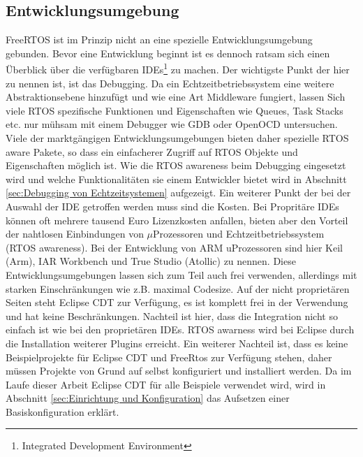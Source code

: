\documentclass[ngerman]{seminarvorlage}
\begin{document}
\subsection{Entwicklungsumgebung}
FreeRTOS ist im Prinzip nicht an eine spezielle Entwicklungsumgebung gebunden. Bevor eine Entwicklung be\-ginnt ist es dennoch ratsam sich einen Überblick über die ver\-fügbaren IDEs\footnote{Integrated Development Environment} zu machen. Der wichtigste Punkt der hier zu nennen ist, ist das Debugging. Da ein Echtzeitbetriebssystem eine weitere Abstraktionsebene hinzufügt und wie eine Art Middleware fungiert, lassen Sich viele RTOS spezifische Funktionen und Eigenschaften wie Queues, Task Stacks etc. nur mühsam mit einem Debugger wie GDB oder OpenOCD untersuchen. Viele der marktgängigen Entwicklungsumgebungen bieten daher spezielle RTOS aware Pakete, so dass ein einfacherer Zugriff auf RTOS Objekte und Eigenschaften möglich ist. Wie die RTOS awareness beim Debugging eingesetzt wird und welche Funktionalitäten sie einem Entwickler bietet wird in Abschnitt \ref{sec:Debugging von Echtzeitsystemen} aufgezeigt. Ein weiterer Punkt der bei der Auswahl der IDE getroffen werden muss sind die Kosten. Bei Propritäre IDEs können oft mehrere tausend Euro Lizenzkosten anfallen, bieten aber den Vorteil der nahtlosen Einbindungen von $\mu$Prozessoren und Echtzeitbetriebssystem (RTOS awareness). Bei der Entwicklung von ARM uProzessoren sind hier Keil (Arm), IAR Workbench und True Studio (Atollic) zu nennen. Diese Entwicklungsumgebungen lassen sich zum Teil auch frei verwenden, allerdings mit starken Einschränkungen wie z.B. maximal Codesize. Auf der nicht proprietären Seiten steht Eclipse CDT zur Verfügung, es ist komplett frei in der Verwendung und hat keine Beschränkungen. Nachteil ist hier, dass die Integration nicht so einfach ist wie bei den proprietären IDEs. RTOS awarness wird bei Eclipse durch die Installation weiterer Plugins erreicht. Ein weiterer Nachteil ist, dass es keine Beispielprojekte für Eclipse CDT und FreeRtos zur Verfügung stehen, daher müssen Projekte von Grund auf selbst konfiguriert und installiert werden. Da im Laufe dieser Arbeit Eclipse CDT für alle Beispiele verwendet wird, wird in Abschnitt \ref{sec:Einrichtung und Konfiguration} das Aufsetzen einer Basiskonfiguration erklärt. 
\end{document}
